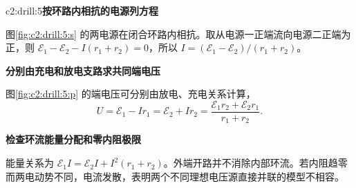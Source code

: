 \begin{drillsolution}{c2:drill:5}\textbf{按环路内相抗的电源列方程}\par\nobreak
图\ref{fig:c2:drill:5:s} 的两电源在闭合环路内相抗。取从电源一正端流向电源二正端为正，则 $\mathcal E_1-\mathcal E_2-I(r_1+r_2)=0$，所以 $I=(\mathcal E_1-\mathcal E_2)/(r_1+r_2)$。



\par\medskip{}\noindent\textbf{分别由充电和放电支路求共同端电压}\par\nobreak
图\ref{fig:c2:drill:5:p} 的端电压可分别由放电、充电关系计算，
\[
 U=\mathcal E_1-Ir_1=\mathcal E_2+Ir_2
 =\frac{\mathcal E_1r_2+\mathcal E_2r_1}{r_1+r_2}.
\]


\par\medskip{}\noindent\textbf{检查环流能量分配和零内阻极限}\par\nobreak
能量关系为 $\mathcal E_1I=\mathcal E_2I+I^2(r_1+r_2)$。外端开路并不消除内部环流。若内阻趋零而两电动势不同，电流发散，表明两个不同理想电压源直接并联的模型不相容。\end{drillsolution}
